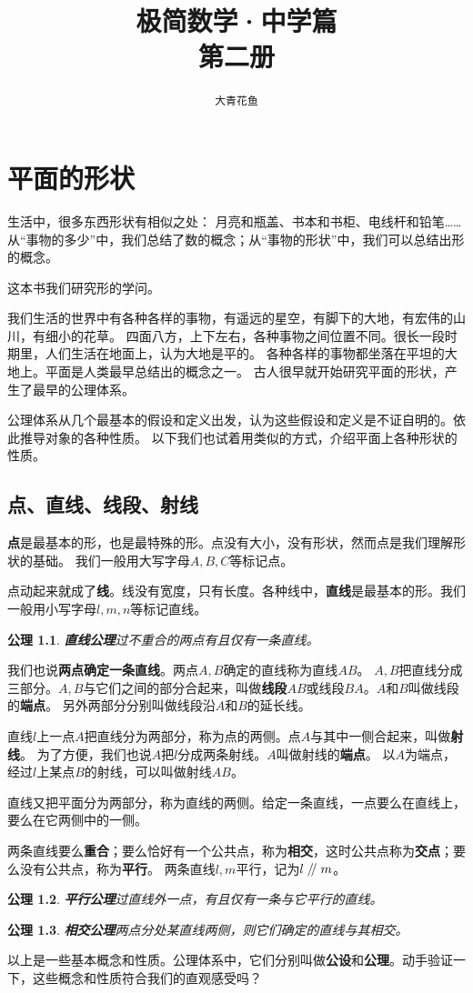 \documentclass[12pt,UTF8]{ctexbook}
\title{\zihao{0} \bfseries 极简数学·中学篇 \\ 第二册}
\author{\zihao{2} \texttt{大青花鱼}}
\date{}
\newtheorem{po}{公理}
\renewcommand\parallel{\mathrel{/\mskip-4mu/}}
\begin{document}
\maketitle
\tableofcontents
\newpage

\chapter{平面的形状}

生活中，很多东西形状有相似之处：
月亮和瓶盖、书本和书柜、电线杆和铅笔……
从“事物的多少”中，我们总结了数的概念；从“事物的形状”中，我们可以总结出形的概念。

这本书我们研究形的学问。

我们生活的世界中有各种各样的事物，有遥远的星空，有脚下的大地，有宏伟的山川，有细小的花草。
四面八方，上下左右，各种事物之间位置不同。很长一段时期里，人们生活在地面上，认为大地是平的。
各种各样的事物都坐落在平坦的大地上。平面是人类最早总结出的概念之一。
古人很早就开始研究平面的形状，产生了最早的公理体系。

公理体系从几个最基本的假设和定义出发，认为这些假设和定义是不证自明的。依此推导对象的各种性质。
以下我们也试着用类似的方式，介绍平面上各种形状的性质。

\section{点、直线、线段、射线}
\textbf{点}是最基本的形，也是最特殊的形。点没有大小，没有形状，然而点是我们理解形状的基础。
我们一般用大写字母$A,B,C$等标记点。

点动起来就成了\textbf{线}。线没有宽度，只有长度。各种线中，\textbf{直线}是最基本的形。我们一般用小写字母$l,m,n$等标记直线。
\begin{po}{\textbf{直线公理}}\label{po:0}
    过不重合的两点有且仅有一条直线。
\end{po}
我们也说\textbf{两点确定一条直线}。两点$A,B$确定的直线称为直线$AB$。
$A,B$把直线分成三部分。$A,B$与它们之间的部分合起来，叫做\textbf{线段}$AB$或线段$BA$。$A$和$B$叫做线段的\textbf{端点}。
另外两部分分别叫做线段沿$A$和$B$的延长线。

直线$l$上一点$A$把直线分为两部分，称为点的两侧。点$A$与其中一侧合起来，叫做\textbf{射线}。
为了方便，我们也说$A$把$l$分成两条射线。$A$叫做射线的\textbf{端点}。
以$A$为端点，经过$l$上某点$B$的射线，可以叫做射线$AB$。

直线又把平面分为两部分，称为直线的两侧。给定一条直线，一点要么在直线上，要么在它两侧中的一侧。

两条直线要么\textbf{重合}；要么恰好有一个公共点，称为\textbf{相交}，这时公共点称为\textbf{交点}；要么没有公共点，称为\textbf{平行}。
两条直线$l,m$平行，记为$l \parallel m$。
\begin{po}{\textbf{平行公理}}\label{po:1}
    过直线外一点，有且仅有一条与它平行的直线。
\end{po}
\begin{po}{\textbf{相交公理}}\label{po:2}
    两点分处某直线两侧，则它们确定的直线与其相交。
\end{po}
以上是一些基本概念和性质。公理体系中，它们分别叫做\textbf{公设}和\textbf{公理}。动手验证一下，这些概念和性质符合我们的直观感受吗？
\end{document}
